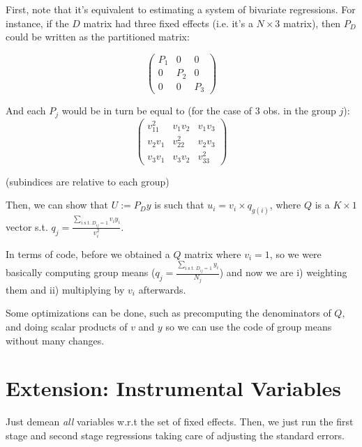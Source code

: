 \documentclass[11pt]{article}
\begin{document}
 First, note that it's equivalent to estimating a system of bivariate regressions. For instance, if the $D$ matrix had three fixed effects (i.e. it's a $N \times 3$ matrix), then $P_D$ could be written as the partitioned matrix:

 \[ \left( \begin{array}{ccc}
P_1 & 0 & 0 \\
0 & P_2 & 0 \\
0 & 0 & P_3 \end{array} \right)\] 

And each $P_j$ would be in turn be equal to (for the case of 3 obs. in the group $j$):
\[ \left( \begin{array}{ccc}
v_{11}^2 & v_1v_2 & v_1v_3 \\
v_2v_1 & v_{22}^2 & v_2v_3 \\
v_3v_1 & v_3v_2 & v_{33}^2 \end{array} \right)\]

(subindices are relative to each group)

Then, we can show that $U := P_{D} y$  is such that $u_i = v_i \times q_{g(i)}$, where $Q$ is a $K \times 1$ vector s.t. $q_j = \frac{\sum_{i \; \text{s.t.} \; D_{ij}=1} v_i y_i}{v_i^2}$.

In terms of code, before we obtained a $Q$ matrix where $v_i=1$, so we were basically computing group means ($q_j = \frac{\sum_{i \; \text{s.t.} \; D_{ij}=1} y_i}{N_j}$) and now we are i) weighting them and ii) multiplying by $v_i$ afterwards.

Some optimizations can be done, such as precomputing the denominators of $Q$, and doing scalar products of $v$ and $y$ so we can use the code of group means without many changes.

\section{Extension: Instrumental Variables}
Just demean \emph{all} variables w.r.t the set of fixed effects. Then, we just run the first stage and second stage regressions taking care of adjusting the standard errors.
\end{document}
